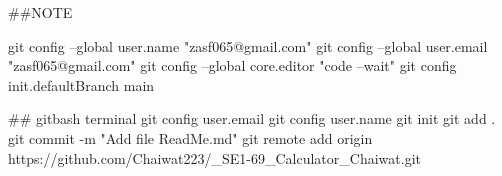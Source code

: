 ##NOTE

git config --global user.name "zasf065@gmail.com" 
git config --global user.email "zasf065@gmail.com"
git config --global core.editor "code --wait"     
git config init.defaultBranch main   

## gitbash terminal
git config user.email
git config user.name
git init
git add .
git commit -m "Add file ReadMe.md"
git remote add origin https://github.com/Chaiwat223/_SE1-69_Calculator_Chaiwat.git